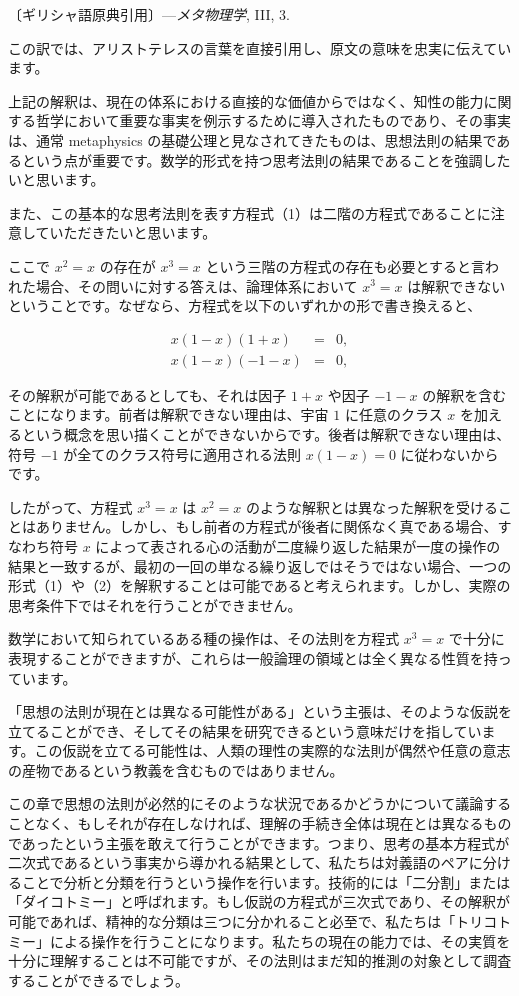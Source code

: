 \documentclass[a4paper,11pt,openany]{ltjsbook}
\begin{document}
〔ギリシャ語原典引用〕---\textit{メタ物理学}, III, 3.

この訳では、アリストテレスの言葉を直接引用し、原文の意味を忠実に伝えています。

上記の解釈は、現在の体系における直接的な価値からではなく、知性の能力に関する哲学において重要な事実を例示するために導入されたものであり、その事実は、通常 metaphysics の基礎公理と見なされてきたものは、思想法則の結果であるという点が重要です。数学的形式を持つ思考法則の結果であることを強調したいと思います。

また、この基本的な思考法則を表す方程式（1）は二階の方程式であることに注意していただきたいと思います。

ここで $x^2 = x$ の存在が $x^3 = x$ という三階の方程式の存在も必要とすると言われた場合、その問いに対する答えは、論理体系において $x^3 = x$ は解釈できないということです。なぜなら、方程式を以下のいずれかの形で書き換えると、

\begin{eqnarray}
x(1-x)(1+x) &=& 0,\\
x(1-x)(-1-x) &=& 0,
\end{eqnarray}

その解釈が可能であるとしても、それは因子 $1 + x$ や因子 $-1 - x$ の解釈を含むことになります。前者は解釈できない理由は、宇宙 $1$ に任意のクラス $x$ を加えるという概念を思い描くことができないからです。後者は解釈できない理由は、符号 $-1$ が全てのクラス符号に適用される法則 $x(1-x) = 0$ に従わないからです。

したがって、方程式 $x^3 = x$ は $x^2 = x$ のような解釈とは異なった解釈を受けることはありません。しかし、もし前者の方程式が後者に関係なく真である場合、すなわち符号 $x$ によって表される心の活動が二度繰り返した結果が一度の操作の結果と一致するが、最初の一回の単なる繰り返しではそうではない場合、一つの形式（1）や（2）を解釈することは可能であると考えられます。しかし、実際の思考条件下ではそれを行うことができません。

数学において知られているある種の操作は、その法則を方程式 $x^3 = x$ で十分に表現することができますが、これらは一般論理の領域とは全く異なる性質を持っています。

「思想の法則が現在とは異なる可能性がある」という主張は、そのような仮説を立てることができ、そしてその結果を研究できるという意味だけを指しています。この仮説を立てる可能性は、人類の理性の実際的な法則が偶然や任意の意志の産物であるという教義を含むものではありません。

この章で思想の法則が必然的にそのような状況であるかどうかについて議論することなく、もしそれが存在しなければ、理解の手続き全体は現在とは異なるものであったという主張を敢えて行うことができます。つまり、思考の基本方程式が二次式であるという事実から導かれる結果として、私たちは対義語のペアに分けることで分析と分類を行うという操作を行います。技術的には「二分割」または「ダイコトミー」と呼ばれます。もし仮説の方程式が三次式であり、その解釈が可能であれば、精神的な分類は三つに分かれること必至で、私たちは「トリコトミー」による操作を行うことになります。私たちの現在の能力では、その実質を十分に理解することは不可能ですが、その法則はまだ知的推測の対象として調査することができるでしょう。
\end{document}
